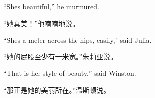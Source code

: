 \begin{paracol}{2}
\switchcolumn*

``She\textquotesingle s beautiful,'' he murmured.

\switchcolumn

``她真美！''他喃喃地说。

\switchcolumn*

``She\textquotesingle s a meter across the hips, easily,'' said Julia.

\switchcolumn

``她的屁股至少有一米宽。''朱莉亚说。

\switchcolumn*

``That is her style of beauty,'' said Winston.

\switchcolumn

``那正是她的美丽所在。''温斯顿说。

\switchcolumn*


\end{paracol}
